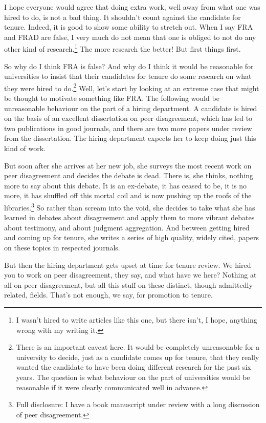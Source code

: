 \documentclass[
  10pt,
  letterpaper,
  DIV=11,
  numbers=noendperiod,
  twoside]{scrartcl}
\begin{document}
I hope everyone would agree that doing extra work, well away from what
one was hired to do, is not a bad thing. It shouldn't count against the
candidate for tenure. Indeed, it is good to show some ability to stretch
out. When I say FRA and FRAD are false, I very much do not mean that one
is obliged to not do any other kind of research.\footnote{I wasn't hired
  to write articles like this one, but there isn't, I hope, anything
  wrong with my writing it.} The more research the better! But first
things first.

So why do I think FRA is false? And why do I think it would be
reasonable for universities to insist that their candidates for tenure
do some research on what they were hired to do.\footnote{There is an
  important caveat here. It would be completely unreasonable for a
  university to decide, just as a candidate comes up for tenure, that
  they really wanted the candidate to have been doing different research
  for the past six years. The question is what behaviour on the part of
  universities would be reasonable if it were clearly communicated well
  in advance.} Well, let's start by looking at an extreme case that
might be thought to motivate something like FRA. The following would be
unreasonable behaviour on the part of a hiring department. A candidate
is hired on the basis of an excellent dissertation on peer disagreement,
which has led to two publications in good journals, and there are two
more papers under review from the dissertation. The hiring department
expects her to keep doing just this kind of work.

But soon after she arrives at her new job, she surveys the most recent
work on peer disagreement and decides the debate is dead. There is, she
thinks, nothing more to say about this debate. It is an ex-debate, it
has ceased to be, it is no more, it has shuffled off this mortal coil
and is now pushing up the roofs of the libraries.\footnote{Full
  disclosure: I have a book manuscript under review with a long
  discussion of peer disagreement.} So rather than scream into the void,
she decides to take what she has learned in debates about disagreement
and apply them to more vibrant debates about testimony, and about
judgment aggregation. And between getting hired and coming up for
tenure, she writes a series of high quality, widely cited, papers on
these topics in respected journals.

But then the hiring department gets upset at time for tenure review. We
hired you to work on peer disagreement, they say, and what have we here?
Nothing at all on peer disagreement, but all this stuff on these
distinct, though admittedly related, fields. That's not enough, we say,
for promotion to tenure.
\end{document}
